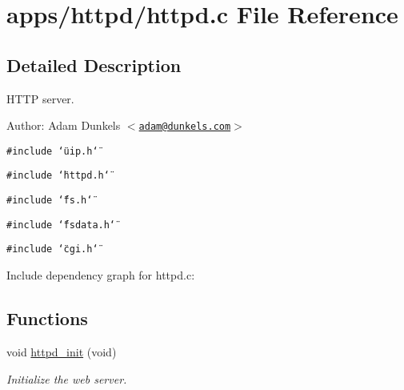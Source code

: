 \hypertarget{a00037}{
\section{apps/httpd/httpd.c File Reference}
\label{a00037}
}


\subsection{Detailed Description}
HTTP server. 

\begin{Desc}
\item[Author:]Adam Dunkels $<$\href{mailto:adam@dunkels.com}{\tt adam@dunkels.com}$>$ \end{Desc}


{\tt \#include \char`\"{}uip.h\char`\"{}}\par
{\tt \#include \char`\"{}httpd.h\char`\"{}}\par
{\tt \#include \char`\"{}fs.h\char`\"{}}\par
{\tt \#include \char`\"{}fsdata.h\char`\"{}}\par
{\tt \#include \char`\"{}cgi.h\char`\"{}}\par


Include dependency graph for httpd.c:\subsection*{Functions}
\begin{CompactItemize}
\item 
void \hyperlink{a00082_gc364305cee969a0be43c071722b136e6}{httpd\_\-init} (void)
\begin{CompactList}\small\item\em Initialize the web server. \item\end{CompactList}\end{CompactItemize}
